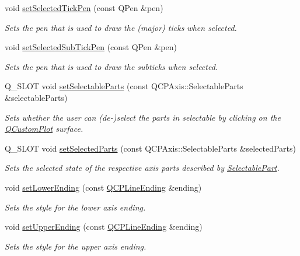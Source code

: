 \begin{DoxyCompactItemize}
void \hyperlink{classQCPAxis_a8360502685eb782edbf04019c9345cdc}{set\+Selected\+Tick\+Pen} (const Q\+Pen \&pen)
\begin{DoxyCompactList}\small\item\em Sets the pen that is used to draw the (major) ticks when selected. \end{DoxyCompactList}\item 
void \hyperlink{classQCPAxis_a2a00a7166600155eac26843132eb9576}{set\+Selected\+Sub\+Tick\+Pen} (const Q\+Pen \&pen)
\begin{DoxyCompactList}\small\item\em Sets the pen that is used to draw the subticks when selected. \end{DoxyCompactList}\item 
Q\+\_\+\+S\+L\+O\+T void \hyperlink{classQCPAxis_a513f9b9e326c505d9bec54880031b085}{set\+Selectable\+Parts} (const Q\+C\+P\+Axis\+::\+Selectable\+Parts \&selectable\+Parts)
\begin{DoxyCompactList}\small\item\em Sets whether the user can (de-\/)select the parts in {\itshape selectable} by clicking on the \hyperlink{classQCustomPlot}{Q\+Custom\+Plot} surface. \end{DoxyCompactList}\item 
Q\+\_\+\+S\+L\+O\+T void \hyperlink{classQCPAxis_ab9d7a69277dcbed9119b3c1f25ca19c3}{set\+Selected\+Parts} (const Q\+C\+P\+Axis\+::\+Selectable\+Parts \&selected\+Parts)
\begin{DoxyCompactList}\small\item\em Sets the selected state of the respective axis parts described by \hyperlink{classQCPAxis_abee4c7a54c468b1385dfce2c898b115f}{Selectable\+Part}. \end{DoxyCompactList}\item 
void \hyperlink{classQCPAxis_a08af1c72db9ae4dc8cb8a973d44405ab}{set\+Lower\+Ending} (const \hyperlink{classQCPLineEnding}{Q\+C\+P\+Line\+Ending} \&ending)
\begin{DoxyCompactList}\small\item\em Sets the style for the lower axis ending. \end{DoxyCompactList}\item 
void \hyperlink{classQCPAxis_a69119b892fc306f651763596685aa377}{set\+Upper\+Ending} (const \hyperlink{classQCPLineEnding}{Q\+C\+P\+Line\+Ending} \&ending)
\begin{DoxyCompactList}\small\item\em Sets the style for the upper axis ending. \end{DoxyCompactList}\item 

\end{DoxyCompactItemize}
